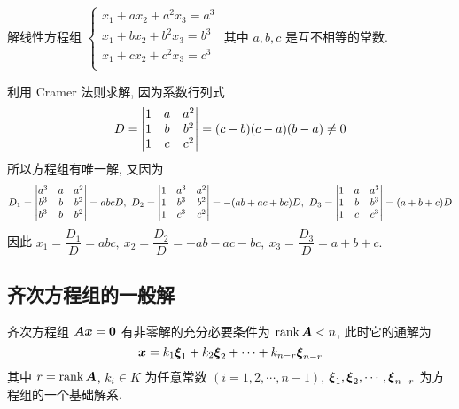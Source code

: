 \begin{example}[2005 华中科技大学]
    解线性方程组 $\begin{cases}
            x_1+ax_2+a^2x_3=a^3 \\
            x_1+bx_2+b^2x_3=b^3 \\
            x_1+cx_2+c^2x_3=c^3 \\
        \end{cases}$
    其中 $a,b,c$ 是互不相等的常数.
\end{example}
\begin{solution}
    利用 Cramer 法则求解, 因为系数行列式 $$D=\mqty|1&a&a^2\\1&b&b^2\\1&c&c^2|=(c-b)(c-a)(b-a)\neq0$$
    所以方程组有唯一解, 又因为
    $$D_1=\mqty|a^3&a&a^2\\b^3&b&b^2\\b^3&b&b^2|=abcD,~D_2=\mqty|1&a^3&a^2\\1&b^3&b^2\\1&c^3&c^2|=-(ab+ac+bc)D,~D_3=\mqty|1&a&a^3\\1&b&b^3\\1&c&c^3|=(a+b+c)D$$
    因此 $x_1=\dfrac{D_1}{D}=abc,~x_2=\dfrac{D_2}{D}=-ab-ac-bc,~x_3=\dfrac{D_3}{D}=a+b+c.$
\end{solution}

\subsection{齐次方程组的一般解}

\begin{theorem}
    齐次方程组 $\vb*{Ax}=\vb*{0}$ 有非零解的充分必要条件为 $\rank\vb*{A}<n$, 此时它的通解为
    $$\vb*{x}=k_1\vb*{\xi}_1+k_2\vb*{\xi}_2+\cdots+k_{n-r}\vb*{\xi}_{n-r}$$
    其中 $r=\rank\vb*{A}$, $k_i\in K\text{ 为任意常数 }(i=1,2,\cdots,n-1)$, $\vb*{\xi}_1,\vb*{\xi}_2,\cdots,\vb*{\xi}_{n-r}$ 为方程组的一个基础解系.
\end{theorem}

